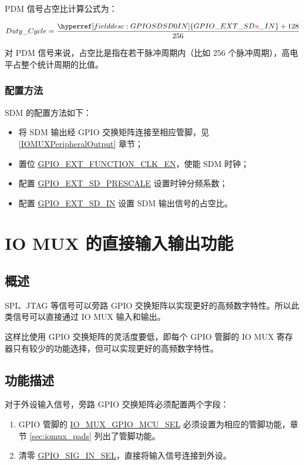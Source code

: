 \documentclass[main\_\_CN.tex]{subfiles}
\begin{document}
PDM 信号占空比计算公式为：

    \[
    Duty\_Cycle=\frac{\hyperref[fielddesc:GPIOSDSD0IN]{GPIO\_EXT\_SD\regindex{n}\_IN} + 128} {256}
    \]

\begin{tiplisting}
对 PDM 信号来说，占空比是指在若干脉冲周期内（比如 256 个脉冲周期），高电平占整个统计周期的比值。
\end{tiplisting}

\subsubsection{配置方法}

SDM 的配置方法如下：

\begin{itemize}
    \item 将 SDM 输出经 GPIO 交换矩阵连接至相应管脚，见 \ref{IOMUXPeripheralOutput} 章节；
    \item 置位 \hyperref[fielddesc:GPIOSDFUNCTIONCLKEN]{GPIO\_EXT\_FUNCTION\_CLK\_EN}，使能 SDM 时钟；
    \item 配置 \hyperref[fielddesc:GPIOSDSD0PRESCALE]{GPIO\_EXT\_SD\_PRESCALE} 设置时钟分频系数；
    \item 配置 \hyperref[fielddesc:GPIOSDSD0IN]{GPIO\_EXT\_SD\_IN} 设置 SDM 输出信号的占空比。
\end{itemize}

\section{IO MUX 的直接输入输出功能}

\subsection{概述}

SPI、JTAG 等信号可以旁路 GPIO 交换矩阵以实现更好的高频数字特性。所以此类信号可以直接通过 IO MUX 输入和输出。

这样比使用 GPIO 交换矩阵的灵活度要低，即每个 GPIO 管脚的 IO MUX 寄存器只有较少的功能选择，但可以实现更好的高频数字特性。

\subsection{功能描述}

对于外设输入信号，旁路 GPIO 交换矩阵必须配置两个字段：

\begin{enumerate}
\item GPIO 管脚的 \hyperref[fielddesc:IOMUXGPIONMCUSEL]{IO\_MUX\_GPIO\_MCU\_SEL} 必须设置为相应的管脚功能，章节 \ref{sec:iomux_pads} 列出了管脚功能。
\item 清零 \hyperref[fielddesc:GPIOSIGNINSEL]{GPIO\_SIG\_IN\_SEL}，直接将输入信号连接到外设。
\end{enumerate}
\end{document}
